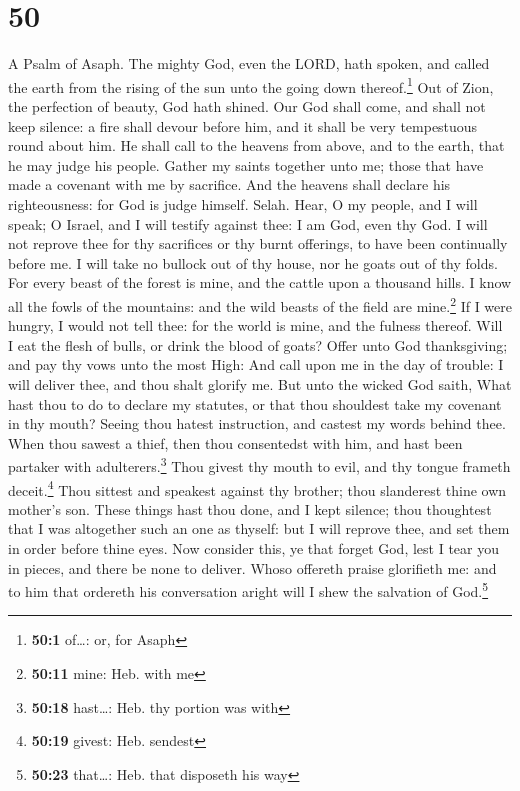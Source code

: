 \hypertarget{section-49}{%
\section{50}\label{section-49}}

A Psalm of Asaph.  The mighty God, even the LORD, hath
spoken, and called the earth from the rising of the sun unto the going
down thereof.\footnote{\textbf{50:1} of\ldots: or, for Asaph}
 Out of Zion, the perfection of beauty, God hath shined.
 Our God shall come, and shall not keep silence: a fire
shall devour before him, and it shall be very tempestuous round about
him.  He shall call to the heavens from above, and to the
earth, that he may judge his people.  Gather my saints
together unto me; those that have made a covenant with me by sacrifice.
 And the heavens shall declare his righteousness: for God
is judge himself. Selah.  Hear, O my people, and I will
speak; O Israel, and I will testify against thee: I am God, even thy
God.  I will not reprove thee for thy sacrifices or thy
burnt offerings, to have been continually before me.  I
will take no bullock out of thy house, nor he goats out of thy folds.
 For every beast of the forest is mine, and the cattle
upon a thousand hills.  I know all the fowls of the
mountains: and the wild beasts of the field are mine.\footnote{\textbf{50:11}
  mine: Heb. with me}  If I were hungry, I would not tell
thee: for the world is mine, and the fulness thereof. 
Will I eat the flesh of bulls, or drink the blood of goats?
 Offer unto God thanksgiving; and pay thy vows unto the
most High:  And call upon me in the day of trouble: I
will deliver thee, and thou shalt glorify me.  But unto
the wicked God saith, What hast thou to do to declare my statutes, or
that thou shouldest take my covenant in thy mouth? 
Seeing thou hatest instruction, and castest my words behind thee.
 When thou sawest a thief, then thou consentedst with
him, and hast been partaker with adulterers.\footnote{\textbf{50:18}
  hast\ldots: Heb. thy portion was with}  Thou givest thy
mouth to evil, and thy tongue frameth deceit.\footnote{\textbf{50:19}
  givest: Heb. sendest}  Thou sittest and speakest
against thy brother; thou slanderest thine own mother's son.
 These things hast thou done, and I kept silence; thou
thoughtest that I was altogether such an one as thyself: but I will
reprove thee, and set them in order before thine eyes. 
Now consider this, ye that forget God, lest I tear you in pieces, and
there be none to deliver.  Whoso offereth praise
glorifieth me: and to him that ordereth his conversation aright will I
shew the salvation of God.\footnote{\textbf{50:23} that\ldots: Heb. that
  disposeth his way}

